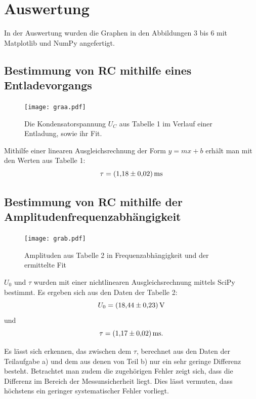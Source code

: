 \section{Auswertung}
\label{sec:Auswertung}
In der Auswertung wurden die Graphen in den Abbildungen 3 bis 6 mit Matplotlib \cite{matplotlib} und NumPy \cite{numpy} angefertigt.

\subsection{Bestimmung von RC mithilfe eines Entladevorgangs}
\begin{figure}[H]
	\centering
	\caption{Die Kondensatorspannung $U_C$ aus Tabelle 1 im Verlauf einer Entladung, sowie ihr Fit.}
	\texttt{[image: graa.pdf]}
	\label{fig:graa}
\end{figure}


Mithilfe einer linearen Ausgleichsrechnung der Form $y = mx+b$ erhält man mit den Werten aus Tabelle 1:
\begin{displaymath}
\tau = \SI{1.18 \pm 0.02}{\milli\second}
\end{displaymath}
\subsection{Bestimmung von RC mithilfe der Amplitudenfrequenzabhängigkeit}
\begin{figure}[H]
	\centering
	\caption{Amplituden aus Tabelle 2 in Frequenzabhängigkeit und der ermittelte Fit}
	\texttt{[image: grab.pdf]}
	\label{fig:grab}
\end{figure}

$U_0$ und $\tau$ wurden mit einer nichtlinearen Ausgleichsrechnung mittels SciPy \cite{scipy} bestimmt. Es ergeben sich aus den Daten der Tabelle 2:
\begin{displaymath}
U_0 = \SI{18.44 \pm 0.23}{\volt}
\end{displaymath}
und
\begin{displaymath}
\tau = \SI{1.17 \pm 0.02}{\milli\second}\text{.}
\end{displaymath}

Es lässt sich erkennen, das zwischen dem $\tau$, berechnet aus den Daten der
 Teilaufgabe a) und dem aus denen von Teil b) nur ein sehr geringe Differenz
  besteht. Betrachtet man zudem die zugehörigen Fehler zeigt sich, dass die
	Differenz im Bereich der Messunsicherheit liegt. Dies lässt vermuten, dass höchstens ein geringer systematischer Fehler vorliegt.

